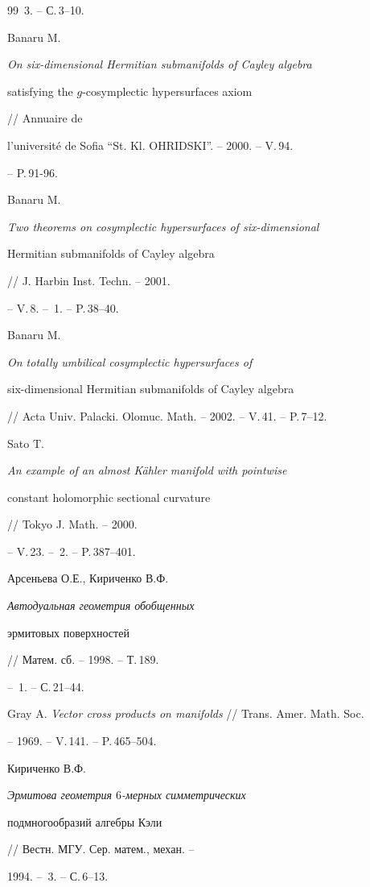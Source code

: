 \begin{thebibliography}{99}
\No\,3. -- С.\,3--10.




Banaru M. {\em On six-dimensional Hermitian submanifolds of Cayley algebra


satisfying the $g$-co\-sym\-plectic hypersurfaces axiom} // Annuaire de 


l'universit\'e de Sofia ``St. Kl. OHRIDSKI''. -- 2000. -- V.\,94.


-- P.\,91-96.




Banaru M. {\em Two theorems on cosymplectic hypersurfaces of six-dimensional 


Hermitian submanifolds of Cayley algebra} // J. Harbin Inst. Techn. -- 2001. 


-- V.\,8. -- \No\,1. -- P.\,38--40.




Banaru M. {\em On totally umbilical cosymplectic hypersurfaces of


six-dimensional Hermitian submanifolds of Cayley algebra}


// Acta Univ. Palacki. Olomuc. Math. -- 2002. -- V.\,41. -- P.\,7--12.




Sato T. {\em An example of an almost K\"ahler manifold with pointwise 


constant holomorphic sectional curvature} // Tokyo J. Math. -- 2000. 


-- V.\,23. -- \No\,2. -- P.\,387--401.




Арсеньева О.Е., Кириченко В.Ф. {\em Автодуальная геометрия обобщенных


эрмитовых поверхностей} // Матем. сб. -- 1998. -- Т.\,189.


-- \No\,1. -- С.\,21--44.




Gray A. {\em Vector cross products on manifolds} // Trans. Amer. Math. Soc.


-- 1969. -- V.\,141. -- P.\,465--504.




Кириченко В.Ф. {\em Эрмитова геометрия $6$-мерных симметрических 


подмногообразий алгебры Кэли} // Вестн. МГУ. Сер. матем., механ. --


1994. -- \No\,3. -- С.\,6--13.





\end{thebibliography}
